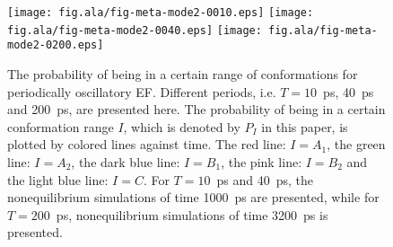 \documentclass[a4paper,preprint,unsortedaddress,onecolumn]{revtex4-1}
\begin{document}
\begin{figure}
  \centering
  \texttt{[image: fig.ala/fig-meta-mode2-0010.eps]}
  \texttt{[image: fig.ala/fig-meta-mode2-0040.eps]}
  \texttt{[image: fig.ala/fig-meta-mode2-0200.eps]}
  \caption{ The probability of being in a certain range of conformations for
    periodically oscillatory EF. Different periods,
    i.e. $T=10$~ps, 40~ps and 200~ps, are presented here.  The
    probability of being in a certain conformation range $I$, which is
    denoted by $P_I$ in this paper, is plotted by colored lines against
    time. The red line: $I = A_1$, the green line: $I = A_2$, the dark
    blue line: $I = B_1$, the pink line: $I = B_2$ and the light blue
    line: $I = C$. For $T=10$~ps and 40~ps, the nonequilibrium
    simulations of time 1000~ps are presented, while for $T=200$~ps,
    nonequilibrium simulations of time 3200~ps is presented.  }
  \label{fig:tmp9}
\end{figure}
\end{document}

